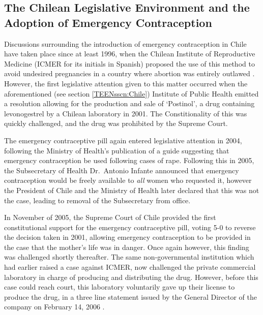 \documentclass[11pt,subeqn]{article}
\begin{document}
\begin{spacing}{1.4}
\clearpage
\section[Additional Details of the Emergency Contraceptive Reform]{The Chilean 
Legislative Environment and the Adoption of Emergency Contraception}
\label{TEENscn:applegislate}
Discussions surrounding the introduction of emergency contraception in Chile
have taken place since at least 1996, when the Chilean Institute of 
Reproductive Medicine (ICMER for its initials in Spanish) proposed the use of
this method to avoid undesired pregnancies in a country where abortion was
entirely outlawed \citep{Dides2009}.  However, the first legislative attention
given to this matter occurred when the aforementioned (see section 
\ref{TEENsscn:Chile}) Institute of Public Health emitted a resolution allowing
for the production and sale of `Postinol', a drug containing levonogestrel by a
Chilean laboratory in 2001.  The Constitionality of this was quickly 
challenged, and the drug was prohibited by the Supreme Court.

The emergency contraceptive pill again entered legislative attention in 2004,
following the Ministry of Health's publication of a guide suggesting that 
emergency contraception be used following cases of rape.  Following this in 
2005, the Subsecretary of Health Dr.\ Antonio Infante announced that emergency
contraception would be freely available to \emph{all} women who requested it,
however the President of Chile and the Ministry of Health later declared that
this was not the case, leading to removal of the Subsecretary from office.

In November of 2005, the Supreme Court of Chile provided the first 
constitutional support for the emergency contraceptive pill, voting 5-0 to
reverse the decision taken in 2001, allowing emergency contraception to be
provided in the case that the mother's life was in danger.  Once again however,
this finding was challenged shortly thereafter.  The same non-governmental 
institution which had earlier raised a case against ICMER, now challenged the 
private commercial laboratory in charge of producing and distributing the drug.  
However, before this case could reach court, this laboratory voluntarily gave 
up their license to produce the drug, in a three line statement issued by the
General Director of the company on February 14, 2006 \citep{CasasBecerra2008}.


\end{spacing}
\end{document}

